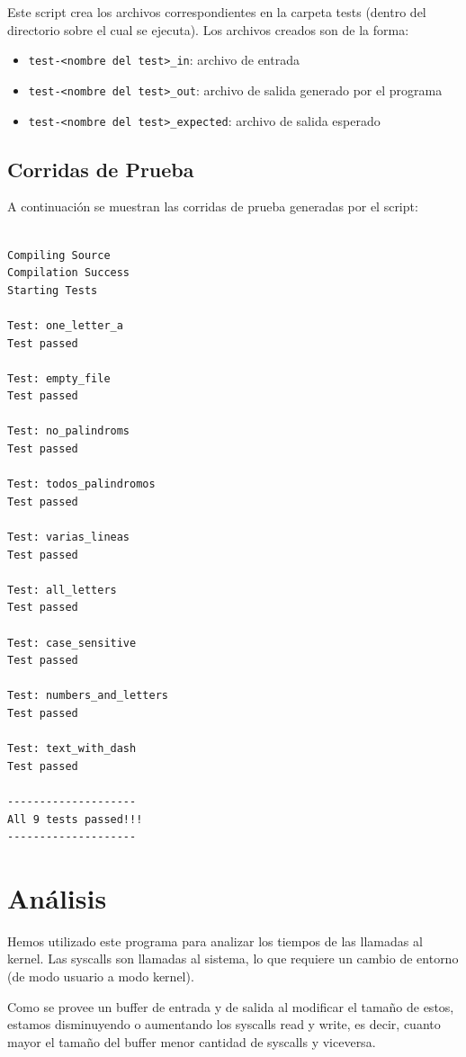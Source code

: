 \documentclass[11pt,a4paper]{article}
\begin{document}
Este script crea los archivos correspondientes en la carpeta tests (dentro del directorio sobre el cual se ejecuta).
Los archivos creados son de la forma:

\begin{itemize}
	\item \texttt{test-<nombre del test>\_in}: archivo de entrada
	\item \texttt{test-<nombre del test>\_out}: archivo de salida generado por el programa
	\item \texttt{test-<nombre del test>\_expected}: archivo de salida esperado
\end{itemize}

\subsection{Corridas de Prueba}
A continuación se muestran las corridas de prueba generadas por el script:

\begin{lstlisting}

Compiling Source
Compilation Success
Starting Tests

Test: one_letter_a
Test passed

Test: empty_file
Test passed

Test: no_palindroms
Test passed

Test: todos_palindromos
Test passed

Test: varias_lineas
Test passed

Test: all_letters
Test passed

Test: case_sensitive
Test passed

Test: numbers_and_letters
Test passed

Test: text_with_dash
Test passed

--------------------
All 9 tests passed!!!
--------------------
\end{lstlisting}

\section{Análisis}
Hemos utilizado este programa para analizar los tiempos de las llamadas al kernel. Las syscalls son llamadas al sistema, lo que requiere un cambio de entorno (de modo usuario a modo kernel).

Como se provee un buffer de entrada y de salida al modificar el tamaño de estos, estamos disminuyendo o aumentando los syscalls read y write, es decir, cuanto mayor el tamaño del buffer menor cantidad de syscalls y viceversa.
\end{document}
